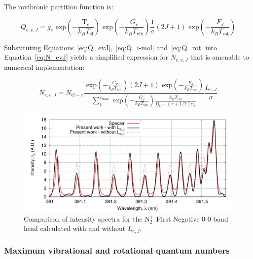 \par

The rovibronic partition function is:

\begin{equation}
 Q_{e,v,J} = g_e \text{~exp} \left ( - \frac{\mathrm{T}_e}{k_B T_\text{el} } \right ) \text{~exp} \left ( - \frac{G_v}{k_B T_\text{vib} } \right ) \frac{1}{\sigma} \left( 2J + 1 \right ) \text{~exp} \left ( - \frac{F_{J}}{k_B T_\text{rot}} \right ) \label{eq:Q_evJ}
\end{equation}

\noindent Substituting Equations~\ref{eq:Q_evJ},~\ref{eq:Q_i-mol} and~\ref{eq:Q_rot} into Equation~\ref{eq:N_evJ} yields a simplified expression for $N_{e,v,J}$ that is amenable to numerical implementation:

\begin{equation}
  N_{e,v,J} = N_{\text{el}-e} \frac{ \text{~exp} \left ( - \frac{G_v}{k_B T_\text{vib} } \right ) \left( 2J + 1 \right ) \text{~exp} \left ( - \frac{F_{J}}{k_B T_\text{rot}} \right )}{ \displaystyle \sum_{v}^{v_\text{max}} \text{~exp} \left ( - \frac{G_{v}}{k_B T_\text{vib}} \right ) \frac{k_B T_\text{rot}}{B_{e} - (v + 1/2) \alpha_{e}}  } \frac{L_{e,J}}{\sigma} \label{eq:N_lvJ_expanded}
\end{equation}

\begin{figure}[htb]
 \includegraphics[width=\linewidth]{figures/spectral-modelling/N2_plus-FirstNeg-intensity_spectra_V_specair.pdf}
 \caption{Comparison of intensity spectra for the N$_2^+$ First Negative 0-0 band head calculated with and without $L_{e,J}$.}
 \label{fig:N2_plus_Vs_specair}
\end{figure}


\subsubsection{Maximum vibrational and rotational quantum numbers}

